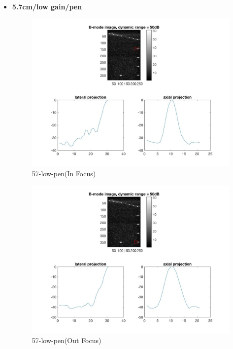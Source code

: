 \documentclass[12pts,a4paper]{article}
\begin{document}
\begin{itemize}
\pagebreak
\item{\textbf{5.7cm/low gain/pen}}
\begin{center}
\end{center}
\begin{figure}[h]
    \centering
    \includegraphics[width=1.0\textwidth]{img_hw1/57-low-pen1.jpg}
    \caption{57-low-pen(In Focus)}
    \label{fig:mesh1}
\end{figure}
\pagebreak
\begin{figure}[h]
    \centering
    \includegraphics[width=1.0\textwidth]{img_hw1/57-low-pen2.jpg}
    \caption{57-low-pen(Out Focus)}
    \label{fig:mesh1}
\end{figure}

\end{itemize}
\end{document}
